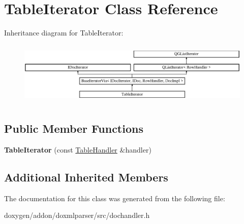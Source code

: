 \hypertarget{class_table_iterator}{}\section{Table\+Iterator Class Reference}
\label{class_table_iterator}
Inheritance diagram for Table\+Iterator\+:\begin{figure}[H]
\begin{center}
\leavevmode
\includegraphics[height=3.076923cm]{class_table_iterator}
\end{center}
\end{figure}
\subsection*{Public Member Functions}
\begin{DoxyCompactItemize}
\item 
\mbox{\label{class_table_iterator_a76646a34a780f978caec7cc7fd2d8b5c}} 
{\bfseries Table\+Iterator} (const \mbox{\hyperlink{class_table_handler}{Table\+Handler}} \&handler)
\end{DoxyCompactItemize}
\subsection*{Additional Inherited Members}


The documentation for this class was generated from the following file\+:\begin{DoxyCompactItemize}
\item 
doxygen/addon/doxmlparser/src/dochandler.\+h\end{DoxyCompactItemize}
